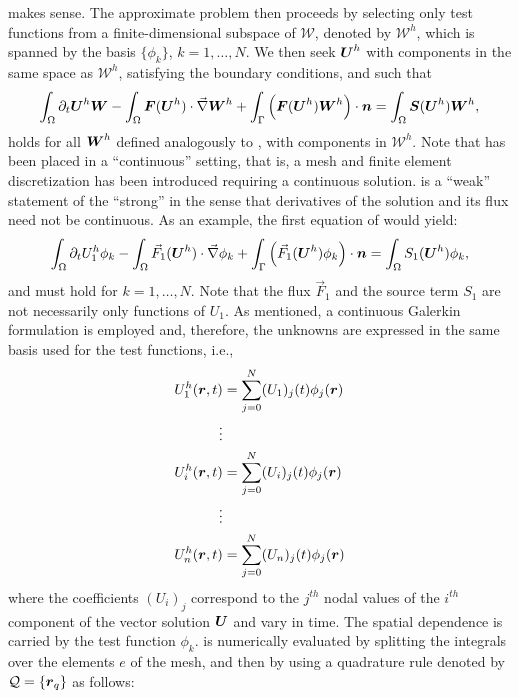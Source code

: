 makes sense.
%
The approximate problem then proceeds by selecting only test functions
from a finite-dimensional subspace of $\mathcal{W}$, denoted by
$\mathcal {W}^h$, which is spanned by the basis $\{\phi_k\}$,
$k=1,\ldots,N$.  We then seek $\boldsymbol U^h$ with components in the same
space as $\mathcal{W}^h$, satisfying the boundary conditions, and such
that
\begin{align}
  \label{en:va_system_weak3}
  \int_\Omega \partial_t \boldsymbol U^h \boldsymbol W -   \int_\Omega \boldsymbol F(\boldsymbol U^h) \cdot \vec{\nabla} \boldsymbol W^h 
+ \int_\Gamma \left( \boldsymbol F(\boldsymbol U^h)  \boldsymbol W^h \right) \cdot \boldsymbol n   =  \int_{\Omega}  \boldsymbol S(\boldsymbol U^h)  \boldsymbol W^h,
\end{align}
holds for all $\boldsymbol W^h$ defined analogously to ,
with components in $\mathcal{W}^h$. Note that 
has been placed in a ``continuous'' setting, that is, a mesh and finite element
discretization has been introduced requiring a continuous solution.  
 is a ``weak'' statement of the ``strong'' 
 in the sense that derivatives of the  
solution and its flux need not be continuous. 
As an example, the first equation of  would yield:
%
\begin{align}
  \label{en:va_system_weak4}
  \int_\Omega \partial_t U_1^h \phi_k -   \int_\Omega \vec{F}_1(\boldsymbol U^h) \cdot \vec{\nabla} \phi_k 
+ \int_\Gamma \left( \vec{F}_1(\boldsymbol U^h) \phi_k \right) \cdot \boldsymbol n   =  \int_{\Omega} S_1(\boldsymbol U^h) \phi_k,
\end{align}
%
and must hold for $k=1,\ldots,N$. Note that the flux $\vec{F}_1$ and the source term $S_1$ are not necessarily only functions of $U_1$.
As mentioned, a continuous
Galerkin formulation is employed and, therefore, the unknowns are expressed in
the same basis used for the test functions, i.e.,
\begin{align}\label{en:va_system_weak4b}
  U_1^h(\boldsymbol r, t) &= \sum_{j=0}^N (U_1)_j(t) \phi_j(\boldsymbol r)
  \\
    \vdots  \nonumber\\
  U_i^h(\boldsymbol r, t) &= \sum_{j=0}^N (U_i)_j(t) \phi_j(\boldsymbol r)
  \\
  \vdots  \nonumber\\
  U_n^h(\boldsymbol r, t) &= \sum_{j=0}^N (U_n)_j(t) \phi_j(\boldsymbol r)
\end{align}
where the coefficients $(U_i)_j$ correspond to the $j^{th}$ nodal values of the $i^{th}$ component of the vector solution $\boldsymbol U$ and vary in time. The spatial dependence is carried by the test function $\phi_k$.  is numerically evaluated by splitting the integrals over the elements $e$ of the mesh, and then by using a quadrature rule denoted by $\mathcal{Q} = \left\{ \boldsymbol r_q \right\}$ as follows:
